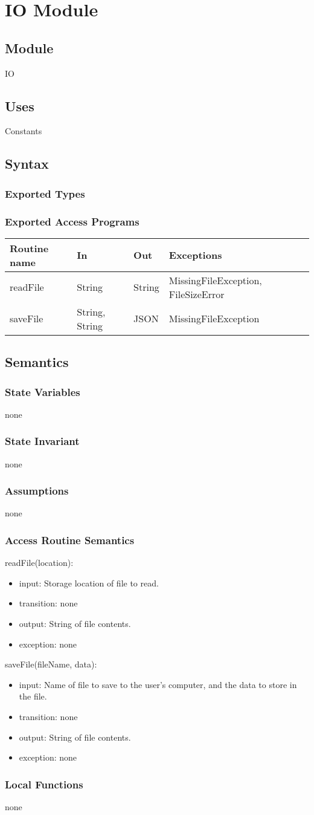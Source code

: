 \documentclass[12pt, titlepage]{article}
\newcommand{\newModule}[9]{
	\subsection* {Module}
		#1
	\subsection* {Uses}
		#2
	\subsection* {Syntax}
		\subsubsection* {Exported Types}
			#3
		\subsubsection* {Exported Access Programs}
			#4
	\subsection* {Semantics}
		\subsubsection* {State Variables}
			#5
		\subsubsection* {State Invariant}
			#6
		\subsubsection* {Assumptions}
			#7
		\subsubsection* {Access Routine Semantics}
			#8
		\subsubsection* {Local Functions}
			#9
}
\newcommand{\newAccessProgram}[5]{
	\noindent #1:
		\begin{itemize}
		    \item input: #2
			\item transition: #3
			\item output: #4
			\item exception: #5
		\end{itemize}
}
\newcommand{\row}[4]{#1 & #2 & #3 & #4 ~\\ \hline}
\newcommand{\accessProgramsTableStart}{
\begin{tabular}{| l | l | l | l |}
\hline
\textbf{Routine name} & \textbf{In} & \textbf{Out} & \textbf{Exceptions}\\
\hline
}
\newcommand{\accessProgramsTableEnd}{
	\end{tabular}
}
\begin{document}
\newpage


\section {IO Module}

\label{IO}

\newModule{IO}
	{%
		Constants
	}
	{%
	}
	{%
		\accessProgramsTableStart
			\row{readFile}{String}{String}{MissingFileException, FileSizeError}
			\row{saveFile}{String, String}{JSON}{MissingFileException}
		\accessProgramsTableEnd
	}
	{%
		none
	}
	{%
        none
	}
	{%
		none
	}
	{%
		\newAccessProgram{readFile(location)}
			{%
				Storage location of file to read.
			}
			{%
				none
			}
			{%
				String of file contents.
			}
			{%
				none
			}
		\newAccessProgram{saveFile(fileName, data)}
			{%
				Name of file to save to the user's computer, and the data to store in the file.
			}
			{%
				none
			}
			{%
				String of file contents.
			}
			{%
				none
			}
	}
	{%
		none
	}
	
\newpage

\end{document}
